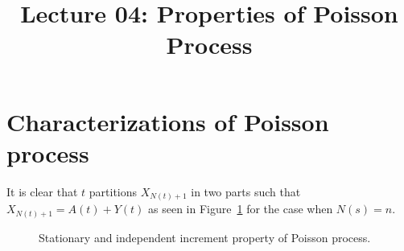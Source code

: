 \documentclass[a4paper,10pt,english]{article}
\title{Lecture 04: Properties of Poisson Process}
\author{}
\begin{document}
\maketitle


\section{Characterizations of Poisson process}

It is clear that $t$ partitions $X_{N(t)+1}$ in two parts such that $X_{N(t)+1} = A(t) + Y(t)$ as seen in Figure~\ref{Fig:IndependentIncrements} for the case when $N(s) = n$. 
\begin{figure}[hhhh]
\center

  \caption{Stationary and independent increment property of Poisson process.}
\label{Fig:IndependentIncrements}
\end{figure}
\end{document}
